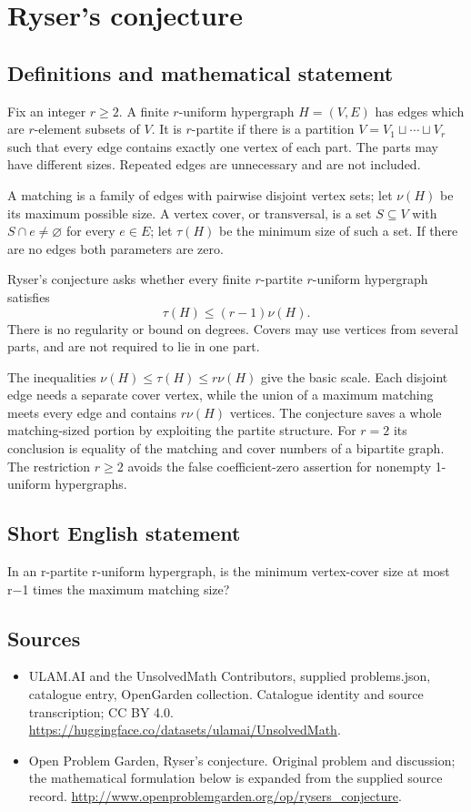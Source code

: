\documentclass[11pt,a4paper]{article}
\begin{document}
\section*{Ryser's conjecture}\label{statement}

\subsection{Definitions and mathematical statement}
Fix an integer $r\ge2$. A finite $r$-uniform hypergraph $H=(V,E)$ has
edges which are $r$-element subsets of $V$. It is $r$-partite if there
is a partition $V=V_1\sqcup\cdots\sqcup V_r$ such that every edge
contains exactly one vertex of each part. The parts may have different
sizes. Repeated edges are unnecessary and are not included.

A matching is a family of edges with pairwise disjoint vertex sets;
let $\nu(H)$ be its maximum possible size. A vertex cover, or
transversal, is a set $S\subseteq V$ with $S\cap e\ne\varnothing$ for
every $e\in E$; let $\tau(H)$ be the minimum size of such a set. If
there are no edges both parameters are zero.

Ryser's conjecture asks whether every finite $r$-partite $r$-uniform
hypergraph satisfies
\[
                             \tau(H)\le(r-1)\nu(H).
\]
There is no regularity or bound on degrees. Covers may use vertices
from several parts, and are not required to lie in one part.

The inequalities $\nu(H)\le\tau(H)\le r\nu(H)$ give the basic scale.
Each disjoint edge needs a separate cover vertex, while the union of
a maximum matching meets every edge and contains $r\nu(H)$ vertices.
The conjecture saves a whole matching-sized portion by exploiting the
partite structure. For $r=2$ its conclusion is equality of the matching
and cover numbers of a bipartite graph. The restriction $r\ge2$
avoids the false coefficient-zero assertion for nonempty 1-uniform
hypergraphs.
\subsection{Short English statement}
In an r-partite r-uniform hypergraph, is the minimum vertex-cover size at most r−1 times the maximum matching size?
\subsection{Sources}
\begin{itemize}
\item[S1] ULAM.AI and the UnsolvedMath Contributors, supplied problems.json, catalogue entry, OpenGarden collection. Catalogue identity and source transcription; CC BY 4.0.
\url{https://huggingface.co/datasets/ulamai/UnsolvedMath}.
\item[S2] Open Problem Garden, Ryser's conjecture. Original problem and discussion; the mathematical formulation below is expanded from the supplied source record.
\url{http://www.openproblemgarden.org/op/rysers_conjecture}.
\end{itemize}
\end{document}
